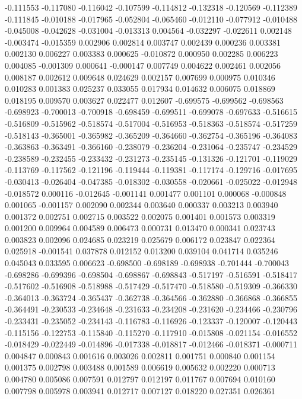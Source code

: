 -0.111553
-0.117080
-0.116042
-0.107599
-0.114812
-0.132318
-0.120569
-0.112389
-0.111845
-0.010188
-0.017965
-0.052804
-0.065460
-0.012110
-0.077912
-0.010488
-0.045008
-0.042628
-0.031004
-0.013313
0.004564
-0.032297
-0.022611
0.002148
-0.003474
-0.015359
0.002906
0.002814
0.003747
0.002439
0.000236
0.003381
0.002130
0.006227
0.003383
0.000625
-0.010872
0.000950
0.002285
0.006223
0.004085
-0.001309
0.000641
-0.000147
0.007749
0.004622
0.002461
0.002056
0.008187
0.002612
0.009648
0.024629
0.002157
0.007699
0.000975
0.010346
0.010283
0.001383
0.025237
0.033055
0.017934
0.014632
0.006075
0.018869
0.018195
0.009570
0.003627
0.022477
0.012607
-0.699575
-0.699562
-0.698563
-0.698923
-0.700013
-0.700918
-0.698459
-0.699511
-0.699078
-0.697633
-0.516615
-0.516809
-0.515962
-0.518574
-0.517004
-0.516953
-0.518363
-0.518574
-0.517259
-0.518143
-0.365001
-0.365982
-0.365209
-0.364660
-0.362754
-0.365196
-0.364083
-0.363863
-0.363491
-0.366160
-0.238079
-0.236204
-0.231064
-0.235747
-0.234529
-0.238589
-0.232455
-0.233432
-0.231273
-0.235145
-0.131326
-0.121701
-0.119029
-0.113769
-0.117562
-0.121196
-0.119444
-0.119381
-0.117174
-0.129716
-0.017695
-0.030413
-0.026404
-0.047385
-0.018302
-0.030558
-0.020661
-0.025022
-0.012948
-0.018572
0.000116
-0.012645
-0.001141
0.001477
0.001101
0.000068
-0.000848
0.001065
-0.001157
0.002090
0.002344
0.003640
0.000337
0.003213
0.003940
0.001372
0.002751
0.002715
0.003522
0.002075
0.001401
0.001573
0.003319
0.001200
0.009964
0.004589
0.006473
0.000731
0.013470
0.000341
0.023743
0.003823
0.002096
0.024685
0.023219
0.025679
0.006172
0.023847
0.022364
0.025918
-0.001541
0.037878
0.012152
0.013200
0.039104
0.041714
0.035246
0.045043
0.033595
0.006623
-0.698500
-0.698189
-0.698938
-0.701444
-0.700043
-0.698286
-0.699396
-0.698504
-0.698867
-0.698843
-0.517197
-0.516591
-0.518417
-0.517602
-0.516908
-0.518988
-0.517429
-0.517470
-0.518580
-0.519309
-0.366330
-0.364013
-0.363724
-0.365437
-0.362738
-0.364566
-0.362880
-0.366868
-0.366855
-0.364491
-0.230533
-0.234648
-0.231633
-0.234208
-0.231620
-0.234466
-0.230796
-0.233431
-0.235052
-0.234143
-0.116783
-0.116926
-0.123337
-0.120007
-0.120443
-0.115156
-0.122753
-0.115840
-0.115270
-0.117910
-0.015808
-0.021154
-0.016552
-0.018429
-0.022449
-0.014896
-0.017338
-0.018817
-0.012466
-0.018371
-0.000711
0.004847
0.000843
0.001616
0.003026
0.002811
0.001751
0.000840
0.001154
0.001375
0.002798
0.003488
0.001589
0.006619
0.005632
0.002220
0.000713
0.004780
0.005086
0.007591
0.012797
0.012197
0.011767
0.007694
0.010160
0.007798
0.005978
0.003941
0.012717
0.007127
0.018220
0.027351
0.026361
